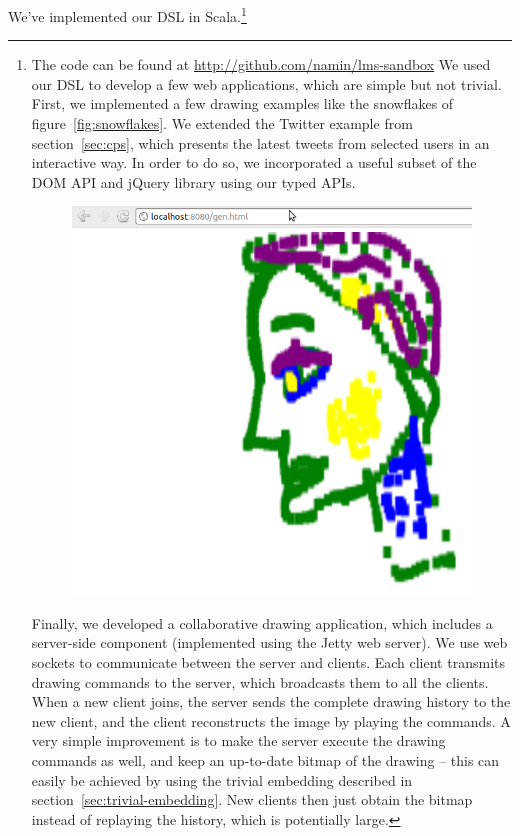 \documentclass[runningheads,a4paper]{llncs}
\begin{document}
We've implemented our DSL in Scala.\footnote{The code can be found at
  \url{http://github.com/namin/lms-sandbox} We used our DSL to
develop a few web applications, which are simple but not
trivial. First, we implemented a few drawing examples like the
snowflakes of figure~\ref{fig:snowflakes}. We extended the Twitter
example from section~\ref{sec:cps}, which presents the latest tweets
from selected users in an interactive way. In order to do so, we
incorporated a useful subset of the DOM API and jQuery library using our
typed APIs.

\begin{figure}
\includegraphics[scale=0.2]{drawing}
\end{figure}
Finally, we developed a collaborative drawing application, which
includes a server-side component (implemented using the Jetty web
server). We use web sockets to communicate between the server and
clients. Each client transmits drawing commands to the server, which
broadcasts them to all the clients. When a new client joins, the
server sends the complete drawing history to the new client, and the
client reconstructs the image by playing the commands. A very
simple improvement is to make the server execute the drawing
commands as well, and keep an up-to-date bitmap of the drawing -- this
can easily be achieved by using the trivial embedding described in
section~\ref{sec:trivial-embedding}. New clients then just obtain the
bitmap instead of replaying the history, which is potentially large.

}
\end{document}
